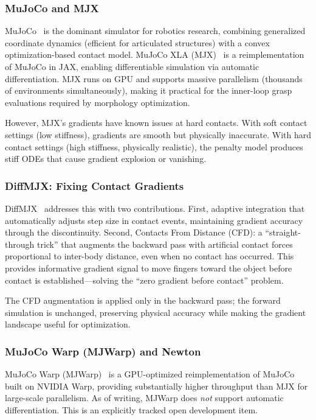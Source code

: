 \documentclass[journal]{IEEEtran}
\begin{document}
\subsubsection{MuJoCo and MJX}

MuJoCo~\cite{mujoco} is the dominant simulator for robotics research, combining generalized
coordinate dynamics (efficient for articulated structures) with a convex optimization-based
contact model.
MuJoCo XLA (MJX)~\cite{mjx2025} is a reimplementation of MuJoCo in JAX, enabling
differentiable simulation via automatic differentiation.
MJX runs on GPU and supports massive parallelism (thousands of environments simultaneously),
making it practical for the inner-loop grasp evaluations required by morphology optimization.

However, MJX's gradients have known issues at hard contacts.
With soft contact settings (low stiffness), gradients are smooth but physically inaccurate.
With hard contact settings (high stiffness, physically realistic), the penalty model
produces stiff ODEs that cause gradient explosion or vanishing.

\subsubsection{DiffMJX: Fixing Contact Gradients}

DiffMJX~\cite{diffmjx2025} addresses this with two contributions.
First, adaptive integration that automatically adjusts step size in contact events,
maintaining gradient accuracy through the discontinuity.
Second, Contacts From Distance (CFD): a ``straight-through trick'' that augments the
backward pass with artificial contact forces proportional to inter-body distance,
even when no contact has occurred.
This provides informative gradient signal to move fingers toward the object before
contact is established---solving the ``zero gradient before contact'' problem.

The CFD augmentation is applied only in the backward pass; the forward simulation is
unchanged, preserving physical accuracy while making the gradient landscape useful
for optimization.

\subsubsection{MuJoCo Warp (MJWarp) and Newton}

MuJoCo Warp (MJWarp)~\cite{mujocowarp2025} is a GPU-optimized reimplementation of MuJoCo
built on NVIDIA Warp, providing substantially higher throughput than MJX for large-scale
parallelism.
As of writing, MJWarp does \emph{not} support automatic differentiation.
This is an explicitly tracked open development item.
\end{document}
